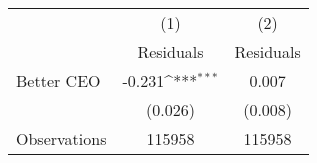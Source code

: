 {
\def\sym#1{\ifmmode^{#1}\else\(^{#1}\)\fi}
\begin{tabular}{l*{2}{c}}
\hline\hline
                    &\multicolumn{1}{c}{(1)}&\multicolumn{1}{c}{(2)}\\
                    &\multicolumn{1}{c}{Residuals}&\multicolumn{1}{c}{Residuals}\\
\hline
Better CEO          &      -0.231\sym{***}&       0.007         \\
                    &     (0.026)         &     (0.008)         \\
\hline
Observations        &      115958         &      115958         \\
\hline\hline
\end{tabular}
}
